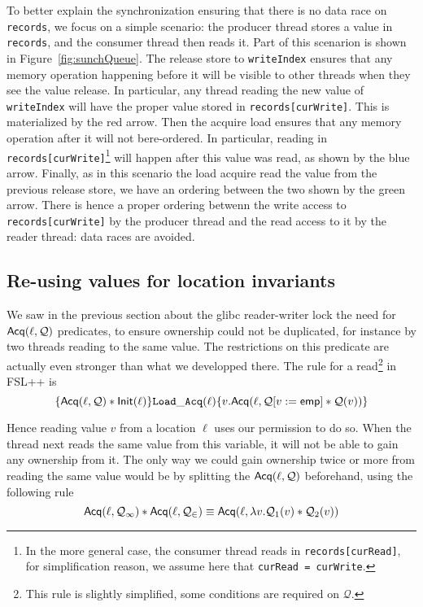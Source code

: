 To better explain the synchronization ensuring that there is no data race on \texttt{records}, we focus on a simple scenario: the producer thread stores a value in \texttt{records}, and the consumer thread then reads it. Part of this scenarion is shown in Figure~\ref{fig:sunchQueue}. The release store to \texttt{writeIndex} ensures that any memory operation happening before it will be visible to other threads when they see the value release. In particular, any thread reading the new value of \texttt{writeIndex} will have the proper value stored in \texttt{records[curWrite]}. This is materialized by the red arrow. Then the acquire load ensures that any memory operation after it will not bere-ordered. In particular, reading in \texttt{records[curWrite]}\footnote{In the more general case, the consumer thread reads in \texttt{records[curRead]}, for simplification reason, we assume here that \texttt{curRead = curWrite}.} will happen after this value was read, as shown by the blue arrow. Finally, as in this scenario the load acquire read the value from the previous release store, we have an ordering between the two shown by the green arrow. There is hence a proper ordering betwenn the write access to \texttt{records[curWrite]} by the producer thread and the read access to it by the reader thread: data races are avoided.

\subsection{Re-using values for location invariants}
We saw in the previous section about the glibc reader-writer lock the need for $\operatorname{\mathsf{Acq}}(\ell, \mathcal{Q})$ predicates, to ensure ownership could not be duplicated, for instance by two threads reading to the same value. The restrictions on this predicate are actually even stronger than what we developped there. The rule for a read\footnote{This rule is slightly simplified, some conditions are required on $\mathcal{Q}$.} in FSL++ is 
\[
		\{\operatorname{\mathsf{Acq}}(\ell, \mathcal{Q}) * \mathsf{Init(\ell)}\} \mathtt{Load\_Acq}(\ell) \{v.\mathsf{Acq}(\ell, \mathcal{Q}[v:=\mathsf{emp}] * \mathcal{Q}(v))\}
\]

Hence reading value $v$ from a location $\ell$ uses our permission to do so. When the thread next reads the same value from this variable, it will not be able to gain any ownership from it. The only way we could gain ownership twice or more from reading the same value would be by splitting the $\operatorname{\mathsf{Acq}}(\ell, \mathcal{Q})$ beforehand, using the following rule
\[
		\operatorname{\mathsf{Acq}}(\ell, \mathcal{Q_{1}}) * \operatorname{\mathsf{Acq}}(\ell, \mathcal{Q_{2}}) \equiv \mathsf{Acq}(\ell, \lambda v. \mathcal{Q}_1(v) * \mathcal{Q}_2(v))
\]

